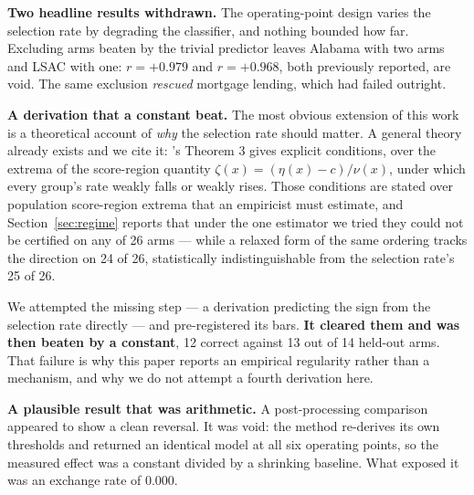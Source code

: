 \documentclass[conference]{IEEEtran}
\begin{document}
\textbf{Two headline results withdrawn.} The operating-point design varies the selection rate by
degrading the classifier, and nothing bounded how far. Excluding arms beaten by the trivial
predictor leaves Alabama with two arms and LSAC with one: $r = +0.979$ and $r = +0.968$, both
previously reported, are void. The same exclusion \emph{rescued} mortgage lending, which had
failed outright.

\textbf{A derivation that a constant beat.} The most obvious extension of this work is a
theoretical account of \emph{why} the selection rate should matter. A general theory already
exists and we cite it: \cite{backfire2026}'s Theorem 3 gives explicit conditions, over the
extrema of the score-region quantity $\zeta(x) = (\eta(x)-c)/\nu(x)$, under which every group's
rate weakly falls or weakly rises. Those conditions are stated over population score-region
extrema that an empiricist must estimate, and Section~\ref{sec:regime} reports that under
the one estimator we tried they could not be certified on any of 26 arms --- while a
relaxed form of the same ordering tracks the direction on 24 of 26, statistically
indistinguishable from the selection rate's 25 of 26.

We attempted the missing step --- a derivation predicting the sign from the selection rate
directly --- and pre-registered its bars. \textbf{It cleared them and was then beaten by a
constant}, 12 correct against 13 out of 14 held-out arms. That failure is why this paper reports
an empirical regularity rather than a mechanism, and why we do not attempt a fourth derivation
here.

\textbf{A plausible result that was arithmetic.} A post-processing comparison appeared to show a
clean reversal. It was void: the method re-derives its own thresholds and returned an identical
model at all six operating points, so the measured effect was a constant divided by a shrinking
baseline. What exposed it was an exchange rate of 0.000.
\end{document}
